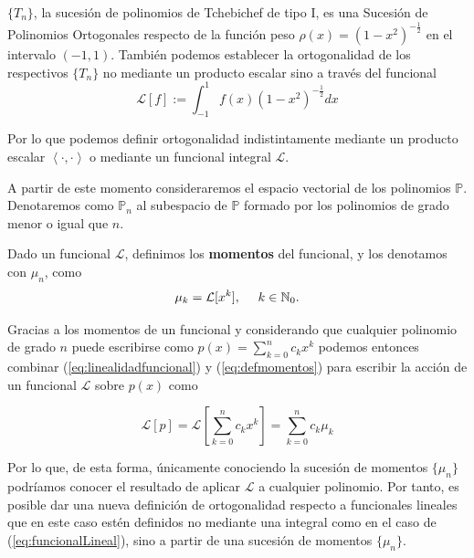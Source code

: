 \begin{ejemplo}
    $\{T_n\}$, la sucesión de polinomios de Tchebichef de tipo I, es una Sucesión de Polinomios Ortogonales respecto de la función peso $\rho(x)=(1-x^2)^{-\frac{1}{2}}$ en el intervalo $(-1,1)$. También podemos establecer la ortogonalidad de los respectivos $\{T_n\}$ no mediante un producto escalar sino a través del funcional
    \begin{equation}
        \label{eq:funcional-tchebichef}
        \mathcal{L}[f]:= \int_{-1}^1 f(x)(1-x^2)^{-\frac{1}{2}}dx
    \end{equation}
\end{ejemplo}

Por lo que podemos definir ortogonalidad indistintamente mediante un producto escalar $\left\langle\cdot,\cdot\right\rangle$ o mediante un funcional integral $\mathcal{L}$.

A partir de este momento consideraremos el espacio vectorial de los polinomios $\mathbb{P}$. Denotaremos como $\mathbb{P}_n$ al subespacio de $\mathbb{P}$ formado por los polinomios de grado menor o igual que $n$.


\begin{definicion}
    Dado un funcional $\mathcal{L}$, definimos los \textbf{momentos} del funcional, y los denotamos con $\mu_n$, como
    \begin{equation}
        \label{eq:defmomentos}
        \mu_k = \mathcal{L}[x^k], \ \ \ \ k\in\mathbb{N}_0.
    \end{equation}    
\end{definicion}

Gracias a los momentos de un funcional y considerando que cualquier polinomio de grado $n$ puede escribirse como $p(x)=\sum_{k=0}^n c_k x^k$ podemos entonces combinar (\ref{eq:linealidadfuncional}) y (\ref{eq:defmomentos}) para  escribir la acción de un funcional $\mathcal{L}$ sobre $p(x)$ como

$$
\mathcal{L}[p] = \mathcal{L}\left[ \sum_{k=0}^n c_k x^k \right] = \sum_{k=0}^n c_k \mu_k
$$

Por lo que, de esta forma, únicamente conociendo la sucesión de momentos $\{\mu_n\}$ podríamos conocer el resultado de aplicar $\mathcal{L}$ a cualquier polinomio. Por tanto, es posible dar una nueva definición de ortogonalidad respecto a funcionales lineales que en este caso estén definidos no mediante una integral como en el caso de (\ref{eq:funcionalLineal}), sino a partir de una sucesión de momentos $\{\mu_n\}$.

